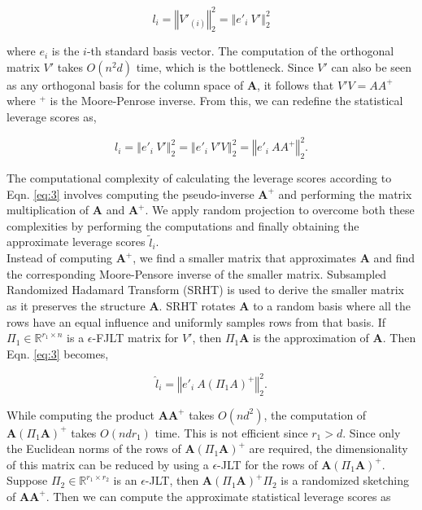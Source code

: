 \begin{equation} \label{eq:2}
l_i = \left\Vert V'_{(i)}\right\Vert_2^2 = \left\Vert e'_i\ V' \right\Vert_2^2
\end{equation}

\noindent where $e_i$ is the $i$-th standard basis vector. The computation of the orthogonal matrix $V'$ takes $O(n^2d)$ time, which is the bottleneck. Since $V'$ can also be seen as any orthogonal basis for the column space of $\textbf{A}$, it follows that $V'V = AA^+$ where $^+$ is the Moore-Penrose inverse. From this, we can redefine the statistical leverage scores as,

\begin{equation} \label{eq:3}
l_i = \left\Vert e'_i\ V' \right\Vert_2^2 = \left\Vert e'_i\ V'V \right\Vert_2^2 = \left\Vert e'_i\ AA^+ \right\Vert_2^2.
\end{equation}

The computational complexity of calculating the leverage scores according to Eqn. \ref{eq:3} involves computing the pseudo-inverse $\textbf{A}^+$ and performing the matrix multiplication of $\textbf{A}$ and $\textbf{A}^+$. We apply random projection to overcome both these complexities by performing the computations and finally obtaining the approximate leverage scores $\tilde{l}_i$. \\ 

Instead of computing $\textbf{A}^+$, we find a smaller matrix that approximates $\textbf{A}$ and find the corresponding Moore-Pensore inverse of the smaller matrix. Subsampled Randomized Hadamard Transform (SRHT) is used to derive the smaller matrix as it preserves the structure $\textbf{A}$. SRHT rotates $\textbf{A}$ to a random basis where all the rows have an equal influence and uniformly samples rows from that basis. If $\Pi_1 \in \mathds{R}^{r_1 \times n}$ is a $\epsilon$-FJLT matrix for $V'$, then $\Pi_1 \textbf{A}$ is the approximation of $\textbf{A}$. Then Eqn. \ref{eq:3} becomes,

\begin{equation} \label{eq:4}
\hat{l}_i = \left\Vert e'_i\ A(\Pi_1 A)^+ \right\Vert_2^2.
\end{equation}

While computing the product $\textbf{A}\textbf{A}^+$ takes $O(nd^2)$, the computation of $\textbf{A}(\Pi_1 \textbf{A})^+$ takes $O(ndr_1)$ time. This is not efficient since $r_1 > d$. Since only the Euclidean norms of the rows of $\textbf{A}(\Pi_1 \textbf{A})^+$ are required, the dimensionality of this matrix can be reduced by using a $\epsilon$-JLT for the rows of $\textbf{A}(\Pi_1 \textbf{A})^+$. Suppose $\Pi_2 \in \mathds{R}^{r_1 \times r_2}$ is an $\epsilon$-JLT, then $\textbf{A}(\Pi_1 \textbf{A})^+ \Pi_2$ is a randomized sketching of $\textbf{A}\textbf{A}^+$. Then we can compute the approximate statistical leverage scores as

